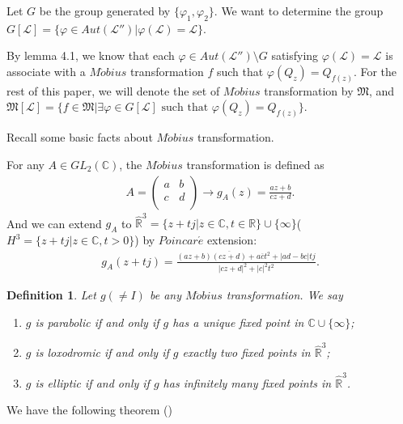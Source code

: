 \documentclass{amsart}
\newcommand{\LLL}{\mathcal L} %
\newcommand{\MMM}{\mathfrak M}
\newcommand{\C}{\mathbb C} %
\newcommand{\R}{\mathbb R}  %
\newtheorem{df}{Definition}[section]
\begin{document}
Let $G$ be the group generated by $\{\varphi_1, \varphi_2 \}$. We want to determine the group $G[\LLL] = \{\varphi \in Aut(\LLL'') | \varphi(\LLL) = \LLL \}$.

By lemma 4.1, we know that each $\varphi \in Aut(\LLL'') \setminus G$ satisfying $\varphi(\LLL) = \LLL$ is associate with a
$M\ddot{o}bius$ transformation $f$ such that $\varphi(Q_z) = Q_{f(z)}$. For the rest of this paper, we will denote the set
of $M\ddot{o}bius$ transformation by $\MMM$, and $\MMM[\LLL] = \{ f \in \MMM | \exists \varphi \in G[\LLL] \mbox{ such that } \varphi(Q_z) = Q_{f(z)} \}$.

Recall some basic facts about $M\ddot{o}bius$ transformation.

For any $A \in GL_{2}(\C)$, the $M\ddot{o}bius$ transformation is defined as
\begin{align*}
A = \left(
  \begin{array}{cc}
    a & b \\
    c & d \\
  \end{array}
\right) \longrightarrow g_{A}(z) = \frac{az + b}{cz + d}.
\end{align*}
And we can extend $g_{A}$ to $\widehat{\R}^{3} = \{ z + tj | z \in \C, t \in \R\} \cup \{\infty \}$($H^{3} = \{ z + tj | z \in \C, t > 0 \}$)
by $Poincar\acute{e}$ extension:
\begin{align}
g_{A}(z + tj) = \frac{(az + b)\overline{(cz + d)} + a\overline{c}t^2 + |ad - bc|tj}{|cz + d|^2 + |c|^2t^2}.
\end{align}

\begin{df}
Let $g( \neq I)$ be any $M\ddot{o}bius$ transformation. We say
\begin{enumerate}
\item $g$ is parabolic if and only if $g$ has a unique fixed point in $\C \cup \{\infty \}$;
\item $g$ is loxodromic if and only if $g$ exactly two fixed points in $\widehat{\R}^{3}$;
\item $g$ is elliptic if and only if $g$ has infinitely many fixed points in $\widehat{\R}^{3}$.
\end{enumerate}
\end{df}

We have the following theorem (\cite{BA})
\end{document}
